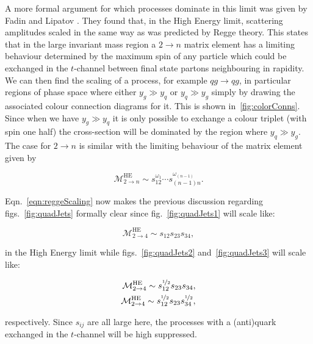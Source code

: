 		A more formal argument for which processes dominate in this limit was given by Fadin and Lipatov
		\cite{Kuraev:1976ge,Balitsky:1978ic}.  They found that, in the High Energy limit, scattering
		amplitudes scaled in the same way as was predicted by Regge theory.  This states that in the
		large invariant mass region a $2\to n$ matrix element has a limiting behaviour determined by
		the maximum spin of any particle which could be exchanged in the $t$-channel between final
		state partons neighbouring in rapidity.  We can then find the scaling of a process, for example
		$qg\to qg$, in particular regions of phase space where either $y_g\gg y_q$ or $y_q\gg y_g$ simply
		by drawing the associated colour connection diagrams for it.  This is shown in~\eqref{fig:colorConns}.
		Since when we have $y_g\gg y_q$ it is only possible to exchange a colour triplet (with spin one half)
		the cross-section will be dominated by the region where $y_q\gg y_g$.  The case for $2\to n$ is similar
		with the limiting behaviour of the matrix element given by

		\begin{equation}
			\mathcal{M}^{\text{HE}}_{2\to n}\sim s_{12}^{\omega_1}\cdots s_{(n-1)n}^{\omega_{(n-1)}}.
			\label{eqn:reggeScaling}
		\end{equation}

		Eqn.~\eqref{eqn:reggeScaling} now makes the previous discussion regarding figs.~\eqref{fig:quadJets}
		formally clear since fig.~\eqref{fig:quadJets1} will scale like:

		\begin{equation}
			\mathcal{M}^{\text{HE}}_{2\to 4} \sim s_{12}s_{23}s_{34},
		\end{equation}

		in the High Energy limit while figs.~\eqref{fig:quadJets2} and~\eqref{fig:quadJets3} will scale
		like:

		\begin{align}
		\begin{split}
			\mathcal{M}^{\text{HE}}_{2\to 4} \sim s_{12}^{\nicefrac{1}{2}}s_{23}s_{34},\\
			\mathcal{M}^{\text{HE}}_{2\to 4} \sim s_{12}^{\nicefrac{1}{2}}s_{23}s_{34}^{\nicefrac{1}{2}},
		\end{split}
		\end{align}

		respectively.  Since $s_{ij}$ are all large here, the processes with a (anti)quark exchanged
		in the $t$-channel will be high suppressed.

